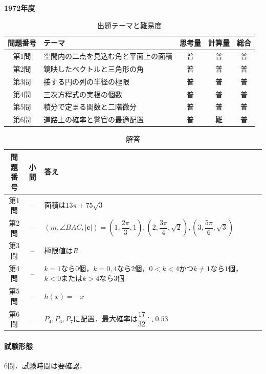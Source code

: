 \documentclass[../../main.tex]{subfiles}
\begin{document}
\begin{center}
  {\fontsize{48pt}{58pt}\selectfont \textbf{1972}\normalsize\textbf{年度}}
\end{center}

\begin{table}[htb]
  \centering
  \caption{出題テーマと難易度}
  \begin{tabular}{|c|p{6.2cm}|c|c|c|}
    \hline
    \textbf{問題番号} & \textbf{テーマ} & \textbf{思考量} & \textbf{計算量} & \textbf{総合} \\
    \hline
    第1問 & 空間内の二点を見込む角と平面上の面積 & 普 & 普 & 普 \\
    \hline
    第2問 & 鏡映したベクトルと三角形の角 & 普 & 普 & 普 \\
    \hline
    第3問 & 接する円の列の半径の極限 & 普 & 普 & 普 \\
    \hline
    第4問 & 三次方程式の実根の個数 & 普 & 普 & 普 \\
    \hline
    第5問 & 積分で定まる関数と二階微分 & 普 & 普 & 普 \\
    \hline
    第6問 & 道路上の確率と警官の最適配置 & 普 & 難 & 普 \\
    \hline
  \end{tabular}
\end{table}

\begin{table}[htb]
  \centering
  \caption{解答}
  \renewcommand{\arraystretch}{1.4}
  \begin{tabular}{|c|c|p{9cm}|}
    \hline
    \textbf{問題番号} & \textbf{小問} & \textbf{答え} \\
    \hline
    第1問 & -- & 面積は$13\pi+75\sqrt{3}$ \\
    \hline
    第2問 & -- & $(m,\angle BAC,|\mathbf{c}|)=\left(1,\dfrac{2\pi}{3},1\right),\left(2,\dfrac{3\pi}{4},\sqrt{2}\right),\left(3,\dfrac{5\pi}{6},\sqrt{3}\right)$ \\
    \hline
    第3問 & -- & 極限値は$R$ \\
    \hline
    第4問 & -- & $k=1$なら$0$個，$k=0,4$なら$2$個，$0<k<4$かつ$k\ne1$なら$1$個，$k<0$または$k>4$なら$3$個 \\
    \hline
    第5問 & -- & $h(x)=-x$ \\
    \hline
    第6問 & -- & $P_4,P_6,P_7$に配置．最大確率は$\dfrac{17}{32}\fallingdotseq0.53$ \\
    \hline
  \end{tabular}
\end{table}

\paragraph{試験形態}
6問．試験時間は要確認．
\end{document}
